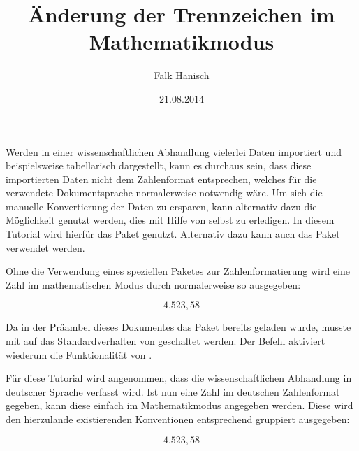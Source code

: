 \documentclass[english,ngerman]{tudscrartcl}
\begin{document}
\title{Änderung der Trennzeichen im Mathematikmodus}
\author{Falk Hanisch}
\date{21.08.2014}
\StartTutorial
{}

Werden in einer wissenschaftlichen Abhandlung vielerlei Daten importiert und 
beispielsweise tabellarisch dargestellt, kann es durchaus sein, dass diese 
importierten Daten nicht dem Zahlenformat entsprechen, welches für die 
verwendete Dokumentsprache normalerweise notwendig wäre. Um sich die manuelle 
Konvertierung der Daten zu ersparen, kann alternativ dazu die Möglichkeit 
genutzt werden, dies mit Hilfe von  selbst zu erledigen. In 
diesem Tutorial wird hierfür das Paket  genutzt. Alternativ 
dazu kann auch das Paket  verwendet werden.

Ohne die Verwendung eines speziellen Paketes zur Zahlenformatierung wird eine 
Zahl im mathematischen Modus durch  normalerweise so 
ausgegeben: 

\begin{Tutorial}
\mathswapoff
\[4.523,58\]
\mathswapon
\end{Tutorial}

Da in der Präambel dieses Dokumentes das Paket  bereits 
geladen wurde, musste mit  auf das Standardverhalten von 
 geschaltet werden. Der Befehl  aktiviert 
wiederum die Funktionalität von .

Für diese Tutorial wird angenommen, dass die wissenschaftlichen Abhandlung in 
deutscher Sprache verfasst wird. Ist nun eine Zahl im deutschen Zahlenformat 
gegeben, kann diese einfach im Mathematikmodus angegeben werden. Diese wird 
den hierzulande existierenden Konventionen entsprechend gruppiert ausgegeben:

\begin{Tutorial}
\[4.523,58\]
\end{Tutorial}
\end{document}
